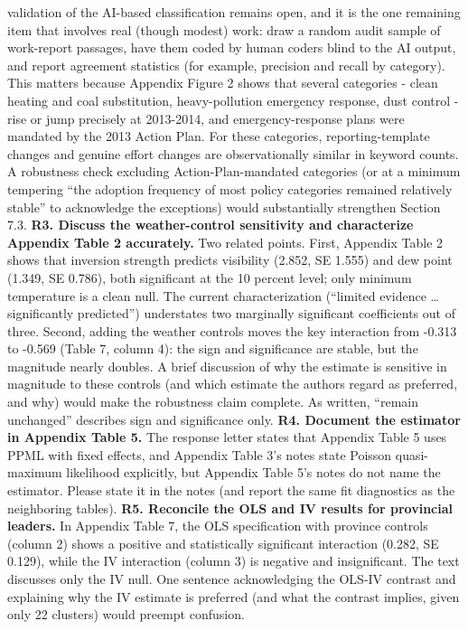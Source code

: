 \documentclass[
  11pt,
]{article}
\begin{document}
validation of the AI-based classification remains open, and it is the
one remaining item that involves real (though modest) work: draw a
random audit sample of work-report passages, have them coded by human
coders blind to the AI output, and report agreement statistics (for
example, precision and recall by category). This matters because
Appendix Figure 2 shows that several categories - clean heating and coal
substitution, heavy-pollution emergency response, dust control - rise or
jump precisely at 2013-2014, and emergency-response plans were mandated
by the 2013 Action Plan. For these categories, reporting-template
changes and genuine effort changes are observationally similar in
keyword counts. A robustness check excluding Action-Plan-mandated
categories (or at a minimum tempering ``the adoption frequency of most
policy categories remained relatively stable'' to acknowledge the
exceptions) would substantially strengthen Section 7.3. \textbf{R3.
Discuss the weather-control sensitivity and characterize Appendix Table
2 accurately.} Two related points. First, Appendix Table 2 shows that
inversion strength predicts visibility (2.852, SE 1.555) and dew point
(1.349, SE 0.786), both significant at the 10 percent level; only
minimum temperature is a clean null. The current characterization
(``limited evidence \ldots{} significantly predicted'') understates two
marginally significant coefficients out of three. Second, adding the
weather controls moves the key interaction from -0.313 to -0.569 (Table
7, column 4): the sign and significance are stable, but the magnitude
nearly doubles. A brief discussion of why the estimate is sensitive in
magnitude to these controls (and which estimate the authors regard as
preferred, and why) would make the robustness claim complete. As
written, ``remain unchanged'' describes sign and significance only.
\textbf{R4. Document the estimator in Appendix Table 5.} The response
letter states that Appendix Table 5 uses PPML with fixed effects, and
Appendix Table 3's notes state Poisson quasi-maximum likelihood
explicitly, but Appendix Table 5's notes do not name the estimator.
Please state it in the notes (and report the same fit diagnostics as the
neighboring tables). \textbf{R5. Reconcile the OLS and IV results for
provincial leaders.} In Appendix Table 7, the OLS specification with
province controls (column 2) shows a positive and statistically
significant interaction (0.282, SE 0.129), while the IV interaction
(column 3) is negative and insignificant. The text discusses only the IV
null. One sentence acknowledging the OLS-IV contrast and explaining why
the IV estimate is preferred (and what the contrast implies, given only
22 clusters) would preempt confusion.
\end{document}
